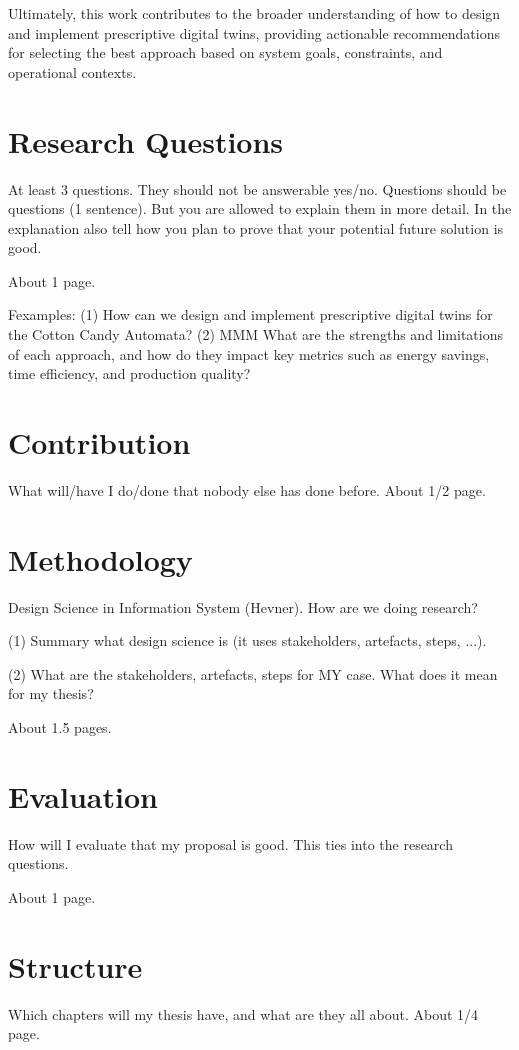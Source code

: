 Ultimately, this work contributes to the broader understanding of how to design and implement prescriptive digital twins, providing actionable recommendations for selecting the best approach based on system goals, constraints, and operational contexts.

\section{Research Questions}
\label{sec:intro:rq}

At least 3 questions. They should not be answerable yes/no. Questions should be
questions (1 sentence). But you are allowed to explain them in more detail. In
the explanation also tell how you plan to prove that your potential future
solution is good.

About 1 page.

Fexamples: 
(1) How can we design and implement prescriptive digital twins for the Cotton Candy Automata?
(2) MMM What are the strengths and limitations of each approach, and how do they impact key metrics such as energy savings, time efficiency, and production quality?

\section{Contribution}
\label{sec:intro:con}

What will/have I do/done that nobody else has done before. About 1/2 page.

\section{Methodology}
\label{sec:intro:meth}

Design Science in Information System (Hevner). How are we doing research?

(1) Summary what design science is (it uses stakeholders, artefacts, steps,
...). 

(2) What are the stakeholders, artefacts, steps for MY case.
What does it mean for my thesis?

About 1.5 pages.

\section{Evaluation}
\label{sec:intro:ev}

How will I evaluate that my proposal is good. This ties into the research questions.

About 1 page.

\section{Structure}
\label{sec:intro:struct}

Which chapters will my thesis have, and what are they all about.
About 1/4 page.
